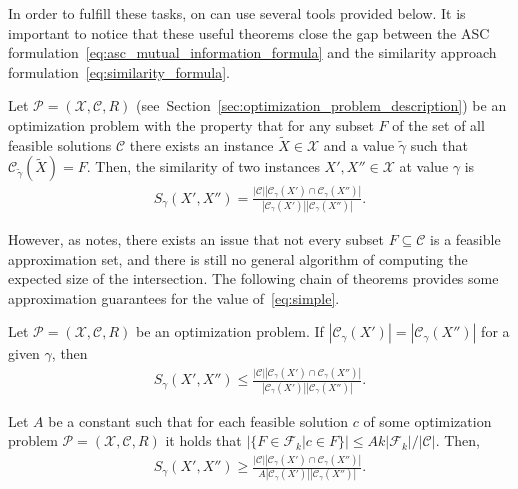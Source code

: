 In order to fulfill these tasks, on can use several tools provided below. It is
important to notice that these useful theorems close the
gap between the ASC formulation~\eqref{eq:asc_mutual_information_formula} and the
similarity approach formulation~\eqref{eq:similarity_formula}.

\begin{theorem}
  \label{thm:simple}
  Let $\mathcal{P} = (\mathcal{X}, \mathcal{C}, R)$
  (see~Section~\ref{sec:optimization_problem_description}) be an optimization
  problem with the property that for any subset $F$ of the set of all feasible
  solutions $\mathcal{C}$ there exists an instance $\tilde X \in \mathcal{X}$
  and a value $\tilde \gamma$ such that $\mathcal{C}_{\tilde \gamma}(\tilde
  X)=F$. Then, the similarity of two instances $X', X''\in\mathcal{X}$ at value
  $\gamma$ is
  \begin{align}
    \label{eq:simple}
    S_\gamma(X',X'')=\frac{|\mathcal{C}||{\mathcal{C}_\gamma}(X') \cap {\mathcal{C}_\gamma}(X'')|}
      {|{\mathcal{C}_\gamma}(X')||{\mathcal{C}_\gamma}(X'')|}.
  \end{align}
\end{theorem}

However, as \citet{Sramek:PhD} notes, there exists an issue that not every subset
$F\subseteq\mathcal{C}$ is a feasible approximation set, and there is still no general
algorithm of computing the expected size of the intersection. The following
chain of theorems provides some approximation guarantees for the value of~\eqref{eq:simple}.

\begin{theorem}
  \label{thm:bound}
  Let $\mathcal{P} = (\mathcal{X}, \mathcal{C}, R)$ be an optimization problem. If
  $|{\mathcal{C}_\gamma}(X')|=|{\mathcal{C}_\gamma}(X'')|$ for a given $\gamma$, then
  \begin{align}
    \label{eq:bound}
    S_\gamma(X',X'') \leq \frac{|\mathcal{C}||{\mathcal{C}_\gamma}(X')\cap {\mathcal{C}_\gamma}(X'')|}
      {|{\mathcal{C}_\gamma}(X')||{\mathcal{C}_\gamma}(X'')|}.
  \end{align}
\end{theorem}

\begin{theorem} 
  \label{thm:approx}
  Let $A$ be a constant such that for each feasible solution $c$ of some
  optimization problem $\mathcal{P} = (\mathcal{X}, \mathcal{C}, R)$ it holds that 
  $|\{F\in \mathcal{F}_k | c\in F\}| \leq A k|\mathcal{F}_k|/|\mathcal{C}|$. Then,
  \begin{align}
    S_\gamma(X',X'')\geq\frac{|\mathcal{C}||{\mathcal{C}_\gamma}(X')\cap {\mathcal{C}_\gamma}(X'')|}
      {A |{\mathcal{C}_\gamma}(X')||{\mathcal{C}_\gamma}(X'')|}.
  \end{align}
\end{theorem}

